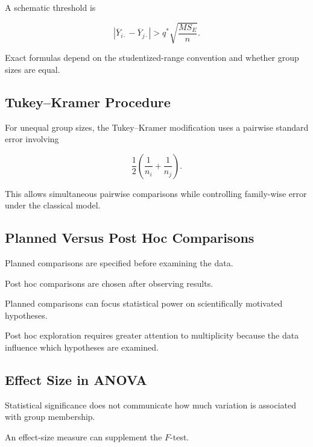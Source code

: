 A schematic threshold is

\[
\boxed{
|\overline{Y}_{i\cdot}
-
\overline{Y}_{j\cdot}|
>
q^*
\sqrt{
\frac{
MS_E
}{n}
}.
}
\]

Exact formulas depend on the studentized-range convention and whether
group sizes are equal.

\subsection{Tukey--Kramer Procedure}
\label{subsec:tukey-kramer}

For unequal group sizes, the Tukey--Kramer modification uses a pairwise
standard error involving

\[
\boxed{
\frac12
\left(
\frac1{n_i}
+
\frac1{n_j}
\right).
}
\]

This allows simultaneous pairwise comparisons while controlling
family-wise error under the classical model.

\subsection{Planned Versus Post Hoc Comparisons}
\label{subsec:planned-versus-posthoc}

Planned comparisons are specified before examining the data.

Post hoc comparisons are chosen after observing results.

Planned comparisons can focus statistical power on scientifically
motivated hypotheses.

Post hoc exploration requires greater attention to multiplicity because
the data influence which hypotheses are examined.

\subsection{Effect Size in ANOVA}
\label{subsec:anova-effect-size}

Statistical significance does not communicate how much variation is
associated with group membership.

An effect-size measure can supplement the \(F\)-test.

